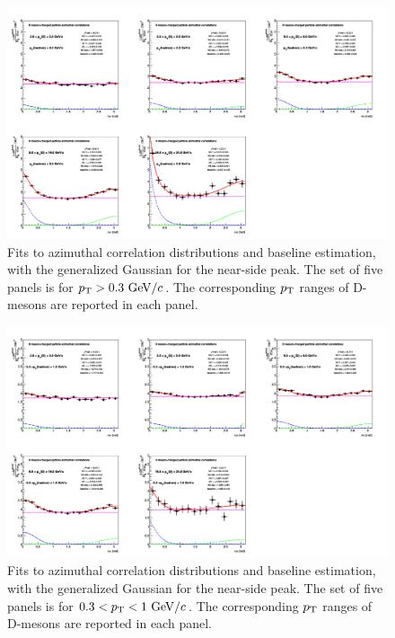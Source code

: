 \begin{figure}[h]
\centering
\includegraphics[width=0.99\linewidth, height=0.70\linewidth,angle=270]{figures/Fits/cFitting_0_pthad0dot3to99dot0_Alt.png}
\caption{Fits to azimuthal correlation distributions and baseline estimation, with the generalized Gaussian for the near-side peak. The set of five panels is for $p_{\rm T}>0.3~\mathrm{GeV}/c$. The corresponding $p_{\rm T}$ ranges of D-mesons are reported in each panel.}
\label{fig:AltFit1}
\end{figure}
\begin{figure}[h]
\centering
\includegraphics[width=0.99\linewidth, height=0.70\linewidth,angle=270]{figures/Fits/cFitting_0_pthad0dot3to1dot_Alt.png}
\caption{Fits to azimuthal correlation distributions and baseline estimation, with the generalized Gaussian for the near-side peak. The set of five panels is for $0.3<p_{\rm T}<1~\mathrm{GeV}/c$. The corresponding $p_{\rm T}$ ranges of D-mesons are reported in each panel.}
\label{fig:AltFit2}
\end{figure}
